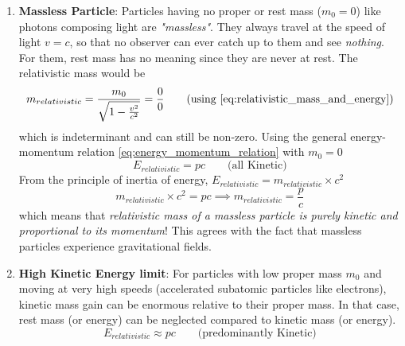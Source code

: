 \documentclass[11pt, a4paper]{article}
\newcommand{\eqrefnp}[1]{\textup{\ref{#1}}}
\begin{document}
\begin{enumerate}
	\item \textbf{Massless Particle}: Particles having no proper or rest mass ($m_{0} = 0$) like photons composing light are \textit{"massless"}. They always travel at the speed of light $v=c$, so that no observer can ever catch up to them and see \textit{nothing}. For them, rest mass has no meaning since they are never at rest. The relativistic mass would be \cite{forshaw2014relativity}
	\begin{equation*}
			m_{relativistic} = \frac{m_{0}}{\sqrt{1 - \frac{v^{2}}{c^{2}}}} = \frac{0}{0} \tag{using \eqrefnp{eq:relativistic_mass_and_energy}}
	\end{equation*}
	which is indeterminant and can still be non-zero. Using the general energy-momentum relation \eqref{eq:energy_momentum_relation} with $m_{0} = 0$
	\begin{equation}\label{eq:E_equals_pc_massless}
		\boxed{E_{relativistic} = pc} \qquad \text{(all Kinetic)}
	\end{equation}
	From the principle of inertia of energy, $E_{relativistic} = m_{relativistic} \times c^{2}$
	\begin{equation}\label{eq:relativistic_mass_eq_p_by_c}
		m_{relativistic} \times c^{2} = pc \implies \boxed{m_{relativistic} = \frac{p}{c}}
	\end{equation}
	which means that \textit{relativistic mass of a massless particle is purely kinetic and proportional to its momentum}! This agrees with the fact that massless particles experience gravitational fields.
	
	\item \textbf{High Kinetic Energy limit}: For particles with low proper mass $m_{0}$ and moving at very high speeds (accelerated subatomic particles like electrons), kinetic mass gain can be enormous relative to their proper mass. In that case, rest mass (or energy) can be neglected compared to kinetic mass (or energy).
	\begin{equation}\label{eq:E_equals_pc_high_kinetic_energy}
		\boxed{E_{relativistic} \approx pc} \qquad \text{(predominantly Kinetic)}
	\end{equation}


\end{enumerate}
\end{document}
